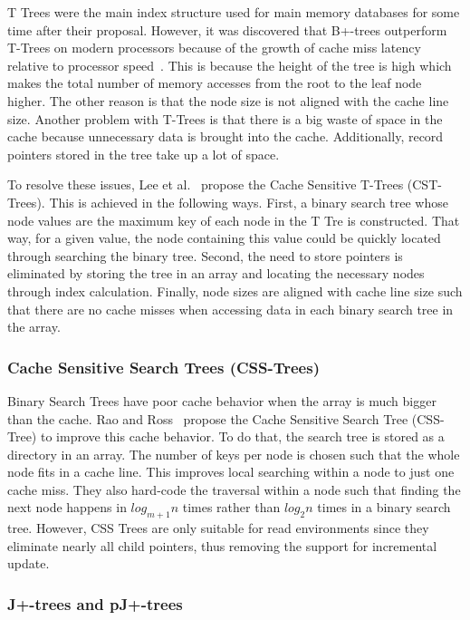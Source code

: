 \documentclass[12pt,a4paper]{article}
\begin{document}
T Trees were the main index structure used for main memory databases for some time after their proposal. However, it was discovered that B+-trees outperform
T-Trees on modern processors because of the growth of cache miss latency relative to processor speed~\cite{rao1999cache,lee2007cst}. This is because the height
of the tree is high which makes the total number of memory accesses from the root to the leaf node higher. The other reason is that the node size is not aligned
with the cache line size. Another problem with T-Trees is that there is a big waste of space in the cache because unnecessary data is brought into the cache.
Additionally, record pointers stored in the tree take up a lot of space.

To resolve these issues, Lee et al.~\cite{lee2007cst} propose the Cache Sensitive T-Trees (CST-Trees). This is achieved in the following ways. First, a binary
search tree whose node values are the maximum key of each node in the T Tre is constructed. That way, for a given value, the node containing this value could be
quickly located through searching the binary tree. Second, the need to store pointers is eliminated by storing the tree in an array and locating the necessary
nodes through index calculation. Finally, node sizes are aligned with cache line size such that there are no cache misses when accessing data in each binary
search tree in the array.

\subsubsection*{Cache Sensitive Search Trees (CSS-Trees)}

Binary Search Trees have poor cache behavior when the array is much bigger than the cache. Rao and Ross~\cite{rao1999cache} propose the Cache Sensitive Search
Tree (CSS-Tree) to improve this cache behavior. To do that, the search tree is stored as a directory in an array. The number of keys per node is chosen such
that the whole node fits in a cache line. This improves local searching within a node to just one cache miss. They also hard-code the traversal within a node
such that finding the next node happens in $log_{m+1}n$ times rather than $log_{2}n$ times in a binary search tree. However, CSS Trees are only suitable for
read environments since they eliminate nearly all child pointers, thus removing the support for incremental update.

\subsubsection*{J+-trees and pJ+-trees}
\cite{luan2009prefetching}
\end{document}

